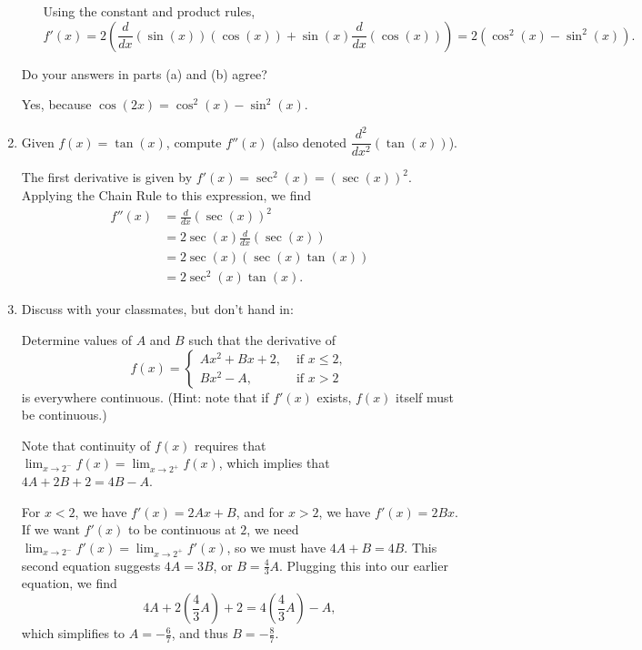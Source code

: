 \documentclass[12pt]{article}
\newcommand{\di}{\displaystyle}
\begin{document}
\begin{enumerate}
\begin{enumerate}
\medskip

Using the constant and product rules,
\[
 f'(x) = 2\left(\frac{d}{dx}(\sin(x))(\cos(x))+\sin(x)\frac{d}{dx}(\cos(x))\right)  = 2(\cos^2(x)-\sin^2(x)).
\]

\bigskip

\end{enumerate}
Do your answers in parts (a) and (b) agree?

\bigskip

Yes, because $\cos(2x) = \cos^2(x)-\sin^2(x)$.

\bigskip


\item Given $f(x)=\tan(x)$, compute $f''(x)$ (also denoted $\dfrac{d^2}{dx^2}(\tan(x))$).

\bigskip

The first derivative is given by $f'(x)=\sec^2(x) = (\sec(x))^2$. Applying the Chain Rule to this expression, we find
\begin{align*}
 f''(x) & = \frac{d}{dx}(\sec(x))^2\\
 & = 2\sec(x)\frac{d}{dx}(\sec(x))\\
 & = 2\sec(x)(\sec(x)\tan(x))\\
 & = 2\sec^2(x)\tan(x).
\end{align*}

\bigskip

\item Discuss with your classmates, but don't hand in:

Determine values of $A$ and $B$ such that the derivative of 
\[
f(x) = \begin{cases}Ax^2+Bx+2, & \text{ if } x\leq 2,\\ Bx^2-A, & \text{ if } x>2\end{cases}
\]
is everywhere continuous. (Hint: note that if $f'(x)$ exists, $f(x)$ itself must be continuous.)

\bigskip

Note that continuity of $f(x)$ requires that $\di \lim_{x\to 2^-}f(x) = \lim_{x\to 2^+}f(x)$, which implies that $4A+2B+2=4B-A$.

For $x<2$, we have $f'(x) = 2Ax+B$, and for $x>2$, we have $f'(x)=2Bx$. If we want $f'(x)$ to be continuous at $2$, we need $\di \lim_{x\to 2^-}f'(x) = \lim_{x\to 2^+}f'(x)$, so we must have $4A+B = 4B$. This second equation suggests $4A=3B$, or $B=\frac{4}{3}A$. Plugging this into our earlier equation, we find
\[
 4A+2\left(\frac{4}{3}A\right) +2 = 4\left(\frac{4}{3}A\right)-A,
\]
 which simplifies to $A=-\frac{6}{7}$, and thus $B = -\frac{8}{7}$.

\end{enumerate}
\end{document}
